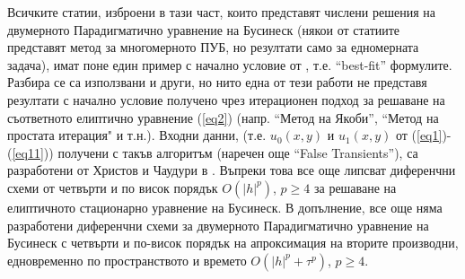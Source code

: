 \documentclass[a4paper]{article}
\newcommand{\rf}[1]{(\ref{#1})}
\theoremstyle{remark}
\begin{document}
\begin{large}
Всичките статии, изброени в тази част, които представят числени решения на двумерното Парадигматично уравнение на Бусинеск (някои от статиите представят метод за многомерното ПУБ, но резултати само за едномерната задача), имат поне един пример с начално условие от \cite{ref15}, т.е. ``best-fit'' формулите. Разбира се са използвани и други, но нито една от тези работи не представя резултати с начално условие получено чрез итерационен подход за решаване на съответното елиптично уравнение \rf{eq2} (напр. ``Метод на Якоби'', ``Метод на простата итерация" и т.н.). Входни данни, (т.е. $u_0(x,y)$ и $u_1(x,y)$ от \rf{eq1}-\rf{eq11}) получени с такъв алгоритъм (наречен още ``False Transients''), са разработени от Христов и Чаудури в \cite{ref117,ref116}. Въпреки това все още липсват диференчни схеми от четвърти и по висок порядък $O(|h|^p)$, $p \ge 4$ за решаване на елиптичното стационарно уравнение на Бусинеск. В допълнение, все още няма разработени диференчни схеми за двумерното Парадигматично уравнение на Бусинеск с четвърти и по-висок порядък на апроксимация на вторите производни, едновременно по пространството и времето $O(|h|^p + \tau^p)$, $p \ge 4$.


\end{large}
\end{document}
